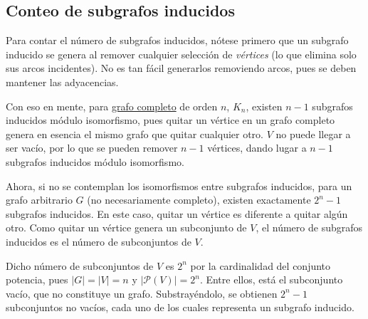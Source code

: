 \begin{center}
  \label{fig:grafo_subgrafo_inducido}
\end{center}

\subsection{Conteo de subgrafos inducidos}
\label{sec:cuantos_subgrafos_inducidos}

Para contar el número de subgrafos inducidos, nótese primero que un subgrafo inducido se genera al remover cualquier selección de \emph{vértices} (lo que elimina solo sus arcos incidentes). No es tan fácil generarlos removiendo arcos, pues se deben mantener las adyacencias.

Con eso en mente, para \hyperref[sec:grafo_completo]{grafo completo} de orden $n$, \(K_n\), existen \(n-1\) subgrafos inducidos módulo isomorfismo, pues quitar un vértice en un grafo completo genera en esencia el mismo grafo que quitar cualquier otro. \(V\) no puede llegar a ser vacío, por lo que se pueden remover \(n-1\) vértices, dando lugar a \(n-1\) subgrafos inducidos módulo isomorfismo.

Ahora, si no se contemplan los isomorfismos entre subgrafos inducidos, para un grafo arbitrario \(G\) (no necesariamente completo), existen exactamente \(2^n-1\) subgrafos inducidos. En este caso, quitar un vértice es diferente a quitar algún otro. Como quitar un vértice genera un subconjunto de \(V\), el número de subgrafos inducidos es el número de subconjuntos de \(V\).

Dicho número de subconjuntos de \(V\) es \(2^n\) por la cardinalidad del conjunto potencia, pues \(|G|=|V|=n\) y \(|\mathcal{P}(V)| = 2^n\). Entre ellos, está el subconjunto vacío, que no constituye un grafo. Substrayéndolo, se obtienen \(2^{n}-1\) subconjuntos no vacíos, cada uno de los cuales representa un subgrafo inducido.


